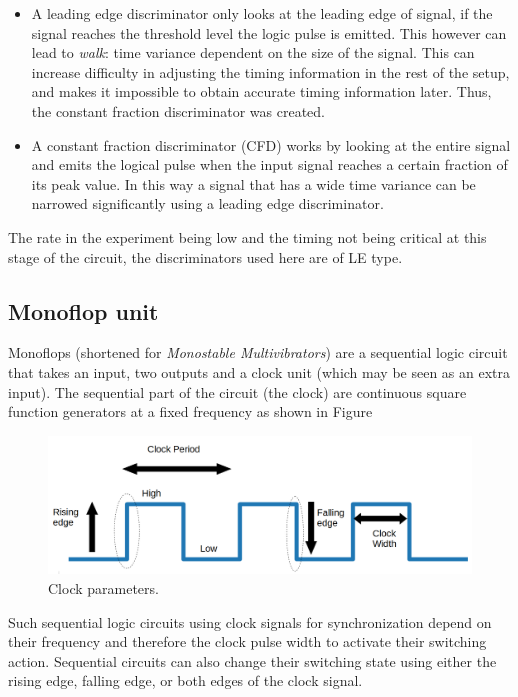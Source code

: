 \begin{itemize}

\item A leading edge discriminator only looks at the leading edge of signal, if the signal reaches the threshold level the logic pulse is emitted. This however can lead to \textit{walk}: time variance dependent on the size of the signal. This can increase difficulty in adjusting the timing information in the rest of the setup, and makes it impossible to obtain accurate timing information later. Thus, the constant fraction discriminator was created.

\item A constant fraction discriminator (CFD) works by looking at the entire signal and emits the logical pulse when the input signal reaches a certain fraction of its peak value. In this way a signal that has a wide time variance can be narrowed significantly using a leading edge discriminator.

\end{itemize}

The rate in the experiment being low and the timing not being critical at this stage of the circuit, the discriminators used here are of LE type.

\subsection{Monoflop unit}

Monoflops (shortened for \textit{Monostable Multivibrators}) are a sequential logic circuit that takes an input, two outputs and a clock unit (which may be seen as an extra input). The sequential part of the circuit (the clock) are continuous square function generators at a fixed frequency as shown in Figure 

\begin{figure}[htbp]
\centering
\includegraphics[width=0.7\linewidth]{./fig/rising.png}
\caption{Clock parameters.}
\label{fig:rising}
\end{figure}

Such sequential logic circuits using clock signals for synchronization depend on their frequency and therefore the clock pulse width to activate their switching action. Sequential circuits can also change their switching state using either the rising edge, falling edge, or both edges of the clock signal.

